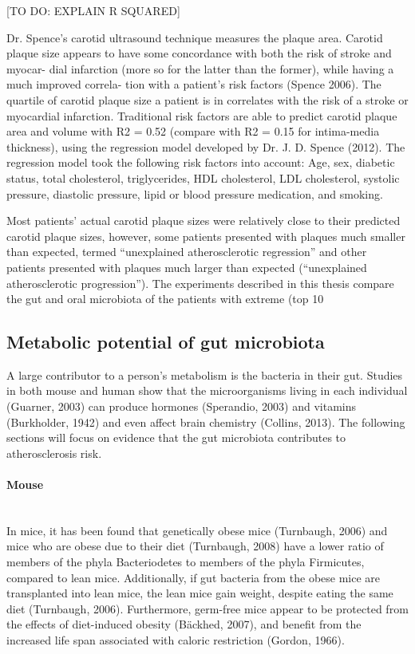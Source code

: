 [TO DO: EXPLAIN R SQUARED]

Dr. Spence’s carotid ultrasound technique measures the plaque area. Carotid plaque size appears to have some concordance with both the risk of stroke and myocar-
dial infarction (more so for the latter than the former), while having a much improved correla-
tion with a patient’s risk factors (Spence 2006). The quartile of carotid plaque size a patient is in correlates with the risk of a stroke or myocardial infarction. Traditional risk factors are able to predict carotid plaque area and volume with R2 = 0.52 (compare with R2 = 0.15 for intima-media thickness), using the regression model developed by Dr. J. D. Spence (2012). The regression model took the following risk factors into account: Age, sex, diabetic status, total cholesterol, triglycerides, HDL cholesterol, LDL cholesterol, systolic pressure, diastolic pressure, lipid or blood pressure medication, and smoking.

Most patients’ actual carotid plaque sizes were relatively close to their predicted carotid plaque sizes, however, some patients presented with plaques much smaller than expected, termed “unexplained atherosclerotic regression” and other patients presented with plaques much larger than expected (“unexplained atherosclerotic progression”). The experiments described in this thesis compare the gut and oral microbiota of the patients with extreme (top 10%

\subsection{Metabolic potential of gut microbiota}
A large contributor to a person’s metabolism is the bacteria in their gut. Studies in both mouse and human show that the microorganisms living in each individual (Guarner, 2003) can produce hormones (Sperandio, 2003) and vitamins (Burkholder, 1942) and even affect brain chemistry (Collins, 2013). The following sections will focus on evidence that the gut microbiota contributes to atherosclerosis risk.

\paragraph{Mouse}\mbox{}\\
In mice, it has been found that genetically obese mice (Turnbaugh, 2006) and mice who are obese due to their diet (Turnbaugh, 2008) have a lower ratio of members of the phyla Bacteriodetes to members of the phyla Firmicutes, compared to lean mice. Additionally, if gut bacteria from the obese mice are transplanted into lean mice, the lean mice gain weight, despite eating the same diet (Turnbaugh, 2006). Furthermore, germ-free mice appear to be protected from the effects of diet-induced obesity (Bäckhed, 2007), and benefit from the increased life span associated with caloric restriction (Gordon, 1966).

